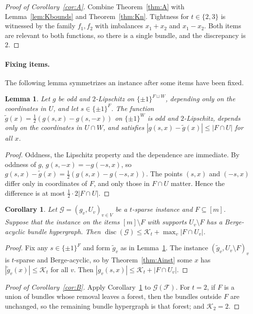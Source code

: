 \documentclass[11pt,letterpaper]{article}
\newtheorem{lemma}[theorem]{Lemma}
\newtheorem{corollary}[theorem]{Corollary}
\theoremstyle{definition}
\newcommand{\cF}{\mathcal{F}}
\newcommand{\cG}{\mathcal{G}}
\newcommand{\cube}[1]{\{\pm1\}^{#1}}
\DeclareMathOperator{\disc}{disc}
\begin{document}
\begin{proof}[Proof of Corollary~\ref{cor:A}]
Combine Theorem~\ref{thm:A} with Lemma~\ref{lem:Kbounds} and Theorem~\ref{thm:Kn}. Tightness for
$t\in\{2,3\}$ is witnessed by the family $f_1,f_2$ with imbalances $x_1+x_2$ and $x_1-x_2$. Both
items are relevant to both functions, so there is a single bundle, and the discrepancy is $2$.
\end{proof}

\paragraph{Fixing items.}
The following lemma symmetrizes an instance after some items have been fixed.

\begin{lemma}\label{lem:oddify}
Let $g$ be odd and $2$-Lipschitz on $\cube{F\sqcup W}$, depending only on the coordinates in $U$,
and let $s\in\cube F$. The function $\tilde g(x)=\frac12(g(s,x)-g(s,-x))$ on $\cube W$ is odd and
$2$-Lipschitz, depends only on the coordinates in $U\cap W$, and satisfies $|g(s,x)-\tilde
g(x)|\le|F\cap U|$ for all $x$.
\end{lemma}

\begin{proof}
Oddness, the Lipschitz property and the dependence are immediate. By oddness of $g$,
$g(s,-x)=-g(-s,x)$, so $g(s,x)-\tilde g(x)=\frac12(g(s,x)-g(-s,x))$. The points $(s,x)$ and
$(-s,x)$ differ only in coordinates of $F$, and only those in $F\cap U$ matter. Hence the
difference is at most $\frac12\cdot2|F\cap U|$.
\end{proof}

\begin{corollary}\label{cor:Binst}
Let $\cG=(g_v,U_v)_{v\in V}$ be a $t$-sparse instance and $F\subseteq[m]$. Suppose that the
instance on the items $[m]\setminus F$ with supports $U_v\setminus F$ has a Berge-acyclic bundle
hypergraph. Then $\disc(\cG)\le \mathcal{K}_t+\max_v|F\cap U_v|$.
\end{corollary}

\begin{proof}
Fix any $s\in\cube F$ and form $\tilde g_v$ as in Lemma~\ref{lem:oddify}. The instance $(\tilde
g_v,U_v\setminus F)_v$ is $t$-sparse and Berge-acyclic, so by Theorem~\ref{thm:Ainst} some $x$
has $|\tilde g_v(x)|\le \mathcal{K}_t$ for all $v$. Then $|g_v(s,x)|\le \mathcal{K}_t+|F\cap U_v|$.
\end{proof}

\begin{proof}[Proof of Corollary~\ref{cor:B}]
Apply Corollary~\ref{cor:Binst} to $\cG(\cF)$. For $t=2$, if $F$ is a union of bundles whose
removal leaves a forest, then the bundles outside $F$ are unchanged, so the remaining bundle
hypergraph is that forest; and $\mathcal{K}_2=2$.
\end{proof}
\end{document}
